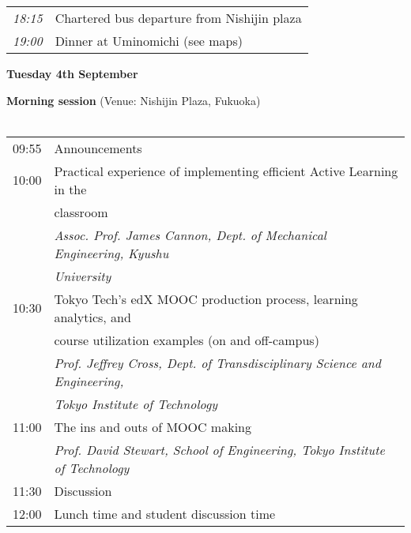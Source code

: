\vspace{3.0em}

\noindent\begin{tabu} to \textwidth {|X[1,l]|X[8,l]|}
    \hline
     \hspace{1em}\emph{18:15}   & Chartered bus departure from Nishijin plaza \\
     \hspace{1em}\emph{19:00}   & Dinner at Uminomichi (see maps) \\
    \hline
\end{tabu}

\newpage
\begin{center}
{\bf \large Tuesday 4th September}
\end{center}
\vspace*{3ex}
{\bf Morning session} (Venue: Nishijin Plaza, Fukuoka)\\

\\
\noindent\begin{tabular}{|l|l|}
    \hline
    09:55   & Announcements \\
    10:00   & Practical experience of implementing efficient Active Learning in the\\
            & classroom \\
            & \emph{Assoc. Prof. James Cannon, Dept. of Mechanical Engineering, Kyushu}\\
            & \emph{University} \\
    10:30   & Tokyo Tech’s edX MOOC production process, learning analytics, and\\
            & course utilization examples (on and off-campus) \\
            & \emph{Prof. Jeffrey Cross, Dept. of Transdisciplinary Science and Engineering,} \\
            & \emph{Tokyo Institute of Technology} \\
    11:00   & The ins and outs of MOOC making \\
            & \emph{Prof. David Stewart, School of Engineering, Tokyo Institute of Technology} \\
    11:30   & Discussion \\
    12:00   & Lunch time and student discussion time \\

    \hline
\end{tabular}
\vspace*{3ex}


